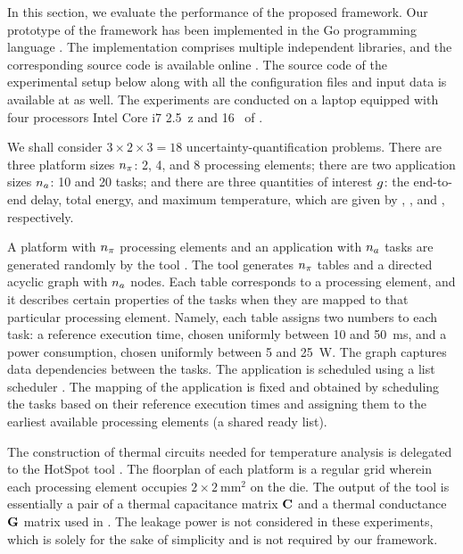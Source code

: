 In this section, we evaluate the performance of the proposed framework. Our
prototype of the framework has been implemented in the Go programming language
\cite{go}. The implementation comprises multiple independent libraries, and the
corresponding source code is available online \cite{sources}. The source code of
the experimental setup below along with all the configuration files and input
data is available at \cite{sources} as well. The experiments are conducted on a
laptop equipped with four processors Intel Core i7 2.5~z and
16~ of .

We shall consider $3 \times 2 \times 3 = 18$ uncertainty-quantification
problems. There are three platform sizes ${n_\pi}$: 2, 4, and 8 processing elements;
there are two application sizes ${n_a}$: 10 and 20 tasks; and there are three
quantities of interest $g$: the end-to-end delay, total energy, and maximum
temperature, which are given by , ,
and , respectively.

A platform with ${n_\pi}$ processing elements and an application with ${n_a}$ tasks
are generated randomly by the  tool \cite{dick1998}. The tool
generates ${n_\pi}$ tables and a directed acyclic graph with ${n_a}$ nodes. Each table
corresponds to a processing element, and it describes certain properties of the
tasks when they are mapped to that particular processing element. Namely, each
table assigns two numbers to each task: a reference execution time, chosen
uniformly between 10 and 50~ms, and a power consumption, chosen uniformly
between 5 and 25~W. The graph captures data dependencies between the tasks. The
application is scheduled using a list scheduler \cite{adam1974}. The mapping of
the application is fixed and obtained by scheduling the tasks based on their
reference execution times and assigning them to the earliest available
processing elements (a shared ready list).

The construction of thermal  circuits needed for temperature analysis
is delegated to the HotSpot tool \cite{skadron2004}. The floorplan of each
platform is a regular grid wherein each processing element occupies $2 \times
2~\text{mm}^2$ on the die. The output of the tool is essentially a pair of a
thermal capacitance matrix $\mathbf{C}$ and a thermal conductance $\mathbf{G}$ matrix used in
. The leakage power is not considered in these experiments,
which is solely for the sake of simplicity and is not required by our framework.

